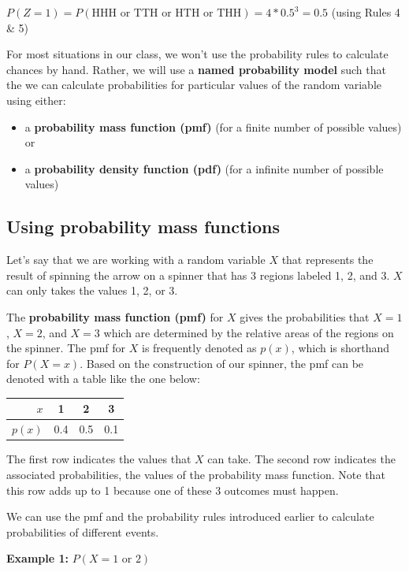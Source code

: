 \documentclass[]{book}
\providecommand{\tightlist}{%
  \setlength{\itemsep}{0pt}\setlength{\parskip}{0pt}}
\begin{document}
\(P(Z = 1) = P(\text{HHH or TTH or HTH or THH}) = 4*0.5^3 = 0.5\) (using Rules 4 \& 5)

For most situations in our class, we won't use the probability rules to calculate chances by hand. Rather, we will use a \textbf{named probability model} such that the we can calculate probabilities for particular values of the random variable using either:

\begin{itemize}
\tightlist
\item
  a \textbf{probability mass function (pmf)} (for a finite number of possible values) or
\item
  a \textbf{probability density function (pdf)} (for a infinite number of possible values)
\end{itemize}

\hypertarget{using-probability-mass-functions}{%
\subsection{Using probability mass functions}\label{using-probability-mass-functions}}

Let's say that we are working with a random variable \(X\) that represents the result of spinning the arrow on a spinner that has 3 regions labeled 1, 2, and 3. \(X\) can only takes the values 1, 2, or 3.

The \textbf{probability mass function (pmf)} for \(X\) gives the probabilities that \(X=1\), \(X=2\), and \(X=3\) which are determined by the relative areas of the regions on the spinner. The pmf for \(X\) is frequently denoted as \(p(x)\), which is shorthand for \(P(X = x)\). Based on the construction of our spinner, the pmf can be denoted with a table like the one below:

\begin{longtable}[]{@{}rccc@{}}
\toprule
\(x\) & 1 & 2 & 3\tabularnewline
\midrule
\endhead
\(p(x)\) & 0.4 & 0.5 & 0.1\tabularnewline
\bottomrule
\end{longtable}

The first row indicates the values that \(X\) can take. The second row indicates the associated probabilities, the values of the probability mass function. Note that this row adds up to 1 because one of these 3 outcomes must happen.

We can use the pmf and the probability rules introduced earlier to calculate probabilities of different events.

\textbf{Example 1:} \(P(X = 1 \text{ or } 2)\)
\end{document}
